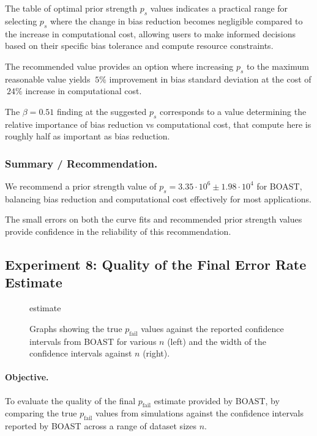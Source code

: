     The table of optimal prior strength $p_s$ values indicates a practical range for selecting $p_s$ where the change in bias reduction becomes negligible compared to the increase in computational cost, allowing users to make informed decisions based on their specific bias tolerance and compute resource constraints.

    The recommended value provides an option where increasing $p_s$ to the maximum reasonable value yields $~5\%$ improvement in bias standard deviation at the cost of $~24\%$ increase in computational cost.

    The $\beta = 0.51$ finding at the suggested $p_s$ corresponds to a value determining the relative importance of bias reduction vs computational cost, that compute here is roughly half as important as bias reduction.

    \subsubsection{Summary / Recommendation.}
    
    We recommend a prior strength value of $p_s = 3.35 \cdot 10^{6} \pm 1.98 \cdot 10^{4}$ for BOAST, balancing bias reduction and computational cost effectively for most applications.

    The small errors on both the curve fits and recommended prior strength values provide confidence in the reliability of this recommendation.

    \subsection{Experiment 8: Quality of the Final Error Rate Estimate}

    \begin{figure}[ht!]
        \centering
        {estimate}
        \caption{Graphs showing the true $p_\text{fail}$ values against the reported confidence intervals from BOAST for various $n$ (left) and the width of the confidence intervals against $n$ (right).}
        \label{fig:estimate_experiment1}
    \end{figure}

    \paragraph{Objective.}
    To evaluate the quality of the final $p_\text{fail}$ estimate provided by BOAST, by comparing the true $p_\text{fail}$ values from simulations against the confidence intervals reported by BOAST across a range of dataset sizes $n$.

